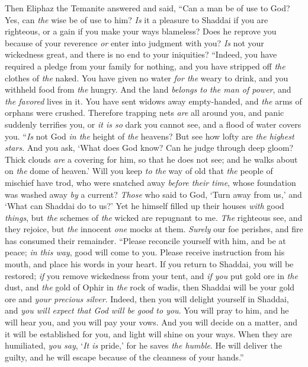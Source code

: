 \begin{biblechapter} %
 Then Eliphaz the Temanite answered and said,
\verse “Can a man be of use to God? 
Yes, can \textit{the} wise be of use to him?
\verse \textit{Is} it a pleasure to Shaddai if you are righteous, 
or a gain if you make your ways blameless?
\verse Does he reprove you because of your reverence 
\textit{or} enter into judgment with you?
\verse \textit{Is} not your wickedness great, 
and there is no end to your iniquities?
\verse “Indeed, you have required a pledge from your family for nothing, 
and you have stripped off \textit{the} clothes of \textit{the} naked.
\verse You have given no water \textit{for the} weary to drink, 
and you withheld food from \textit{the} hungry.
\verse And the land \textit{belongs to the man of power}, 
and \textit{the favored} lives in it.
\verse You have sent widows away empty-handed, 
and \textit{the} arms of orphans were crushed.
\verse Therefore trapping nets \textit{are} all around you, 
and panic suddenly terrifies you,
\verse or \textit{it is so} dark you cannot see, 
and a flood of water covers you.
\verse “\textit{Is} not God \textit{in the} height of \textit{the} heavens? 
But see how lofty are \textit{the highest stars}.
\verse And you ask, ‘What does God know? 
Can he judge through deep gloom?
\verse Thick clouds \textit{are} a covering for him, so that he does not see; 
and he walks about on \textit{the} dome of heaven.’
\verse Will you keep \textit{to the} way of old 
that \textit{the} people of mischief have trod,
\verse who were snatched away \textit{before their time}, 
whose foundation was washed away \textit{by} a current?
\verse \textit{Those} who said to God, ‘Turn away from us,’ 
and ‘What can Shaddai do to us?’
\verse Yet he himself filled up their houses \textit{with} good \textit{things}, 
but \textit{the} schemes of \textit{the} wicked are repugnant to me.
\verse \textit{The} righteous see, and they rejoice, 
but \textit{the} innocent \textit{one} mocks at them.
\verse \textit{Surely} our foe perishes, 
and fire has consumed their remainder.
\verse “Please reconcile yourself with him, 
and be at peace; \textit{in this way}, good will come to you.
\verse Please receive instruction from his mouth, 
and place his words in your heart.
\verse If you return to Shaddai, you will be restored; 
\textit{if} you remove wickedness from your tent,
\verse and \textit{if you} put gold ore in \textit{the} dust, 
and \textit{the} gold of Ophir in \textit{the} rock of wadis,
\verse then Shaddai will be your gold ore 
and \textit{your precious silver}.
\verse Indeed, then you will delight yourself in Shaddai, 
and \textit{you will expect that God will be good to you}.
\verse You will pray to him, and he will hear you, 
and you will pay your vows.
\verse And you will decide on a matter, and it will be established for you, 
and light will shine on your ways.
\verse When they are humiliated, \textit{you say}, ‘\textit{It is} pride,’ 
for he saves \textit{the humble}.
\verse He will deliver the guilty, 
and he will escape because of the cleanness of your hands.”
\end{biblechapter}

